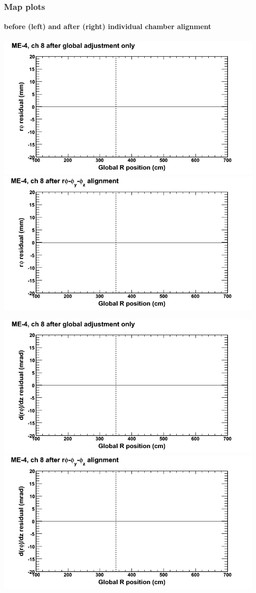 \documentclass[compress]{beamer}
\begin{document}
\begin{frame}
\frametitle{Map plots}
\framesubtitle{before (left) and after (right) individual chamber alignment}
\includegraphics[width=0.5\linewidth]{ringmapplots_3dof/before_CSCvsr_mem4ch08_x.png} \includegraphics[width=0.5\linewidth]{ringmapplots_3dof/after_CSCvsr_mem4ch08_x.png}

\includegraphics[width=0.5\linewidth]{ringmapplots_3dof/before_CSCvsr_mem4ch08_dxdz.png} \includegraphics[width=0.5\linewidth]{ringmapplots_3dof/after_CSCvsr_mem4ch08_dxdz.png}
\end{frame}
\end{document}
